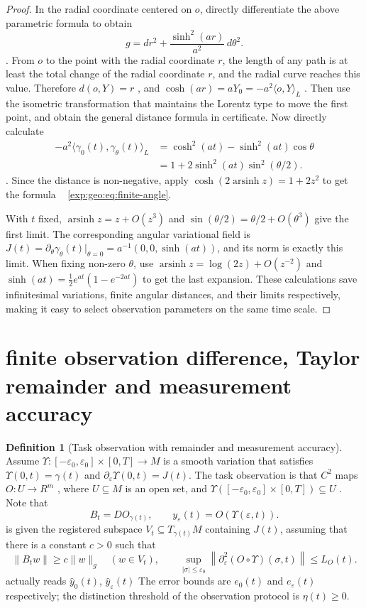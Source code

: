 \documentclass[12pt,a4paper,openany,notitlepage]{report}
\theoremstyle{plain}
\theoremstyle{definition}
\newtheorem{definition}[theorem]{Definition}
\theoremstyle{remark}
\def\mathcal#1{#1}\def\mathsf#1{#1}\def\mathbb#1{#1}%
\begin{document}
\begin{CJK*}
\begin{proof}
In the radial coordinate centered on $o$, directly differentiate the above parametric formula to obtain \[
g=dr^2+\frac{\sinh^2(ar)}{a^2}\,d\theta^2.
\]. From $o$ to the point with the radial coordinate $r$, the length of any path is at least the total change of the radial coordinate $r$, and the radial curve reaches this value. Therefore $d(o,Y)=r$ , and $\cosh(ar)=aY_0=-a^2\langle o,Y\rangle_L$ . Then use the isometric transformation that maintains the Lorentz type to move the first point, and obtain the general distance formula in certificate. Now directly calculate \[
\begin{aligned}
-a^2\langle\gamma_0(t),\gamma_\theta(t)\rangle_L
&=\cosh^2(at)-\sinh^2(at)\cos\theta\\
&=1+2\sinh^2(at)\sin^2(\theta/2).
\end{aligned}
\]. Since the distance is non-negative, apply $\cosh(2\operatorname{arsinh}z)=1+2z^2$ to get the formula ~ \eqref{exp:geo:eq:finite-angle}.

With $t$ fixed, $\operatorname{arsinh}z=z+O(z^3)$ and $\sin(\theta/2)=\theta/2+O(\theta^3)$ give the first limit. The corresponding angular variational field is $J(t)=\partial_\theta\gamma_\theta(t)|_{\theta=0}
=a^{-1}(0,0,\sinh(at))$, and its norm is exactly this limit. When fixing non-zero $\theta$, use $\operatorname{arsinh}z=\log(2z)+O(z^{-2})$ and $\sinh(at)=\tfrac12e^{at}(1-e^{-2at})$ to get the last expansion. These calculations save infinitesimal variations, finite angular distances, and their limits respectively, making it easy to select observation parameters on the same time scale.\end{proof}


\section { finite observation difference, Taylor remainder and measurement accuracy }\label{exp:geo:section:finite-observation}


\begin{definition}
[Task observation with remainder and measurement accuracy]\label{hgov:geo:def:observation}
Assume $\Upsilon:[-\varepsilon_0,\varepsilon_0]\times[0,T]\to M$ is a smooth variation that satisfies $\Upsilon(0,t)=\gamma(t)$ and $\partial_\varepsilon\Upsilon(0,t)=J(t)$. The task observation is that $C^2$ maps $\mathcal O:U\to\mathbb R^m$ , where $U\subseteq M$ is an open set, and $\Upsilon([-\varepsilon_0,\varepsilon_0]\times[0,T])\subseteq U$ . Note that \[
B_t=D\mathcal O_{\gamma(t)},\qquad
y_\varepsilon(t)=\mathcal O(\Upsilon(\varepsilon,t)).
\] is given the registered subspace $V_t\subseteq T_{\gamma(t)}M$ containing $J(t)$, assuming that there is a constant $c>0$ such that \[
\lVert B_tw\rVert\ge c\lVert w\rVert_g
\quad(w\in V_t),\qquad
\sup_{|\sigma|\le\varepsilon_0}
\left\lVert\partial_\varepsilon^2
(\mathcal O\circ\Upsilon)(\sigma,t)\right\rVert\le L_{\mathcal O}(t).
\] actually reads $\widehat y_0(t)$, $\widehat y_\varepsilon(t)$ The error bounds are $e_0(t)$ and $e_\varepsilon(t)$ respectively; the distinction threshold of the observation protocol is $\eta(t)\ge0$.\end{definition}



\end{CJK*}
\end{document}
